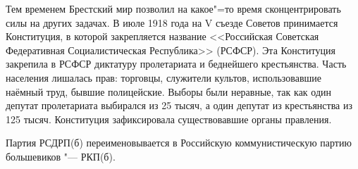 Тем временем Брестский мир позволил на какое"=то время сконцентрировать силы на других задачах. В июле 1918 года на V съезде Советов принимается Конституция, в которой закрепляется название <<Российская Советская Федеративная Социалистическая Республика>> (РСФСР). Эта Конституция закрепила в РСФСР диктатуру пролетариата и беднейшего крестьянства. Часть населения лишалась прав: торговцы, служители культов, использовавшие наёмный труд, бывшие полицейские. Выборы были неравные, так как один депутат пролетариата выбирался из 25 тысяч, а один депутат из крестьянства из 125 тысяч. Конституция зафиксировала существовавшие органы правления.

Партия РСДРП(б) переименовывается в Российскую коммунистическую партию большевиков "--- РКП(б).
